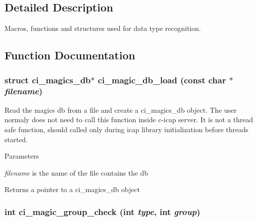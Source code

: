 \subsection{Detailed Description}
Macros, functions and structures used for data type recognition. 

\subsection{Function Documentation}
\hypertarget{group__DATATYPE_ga61edd8dcf006a279f7f310b5304c9127}{
\subsubsection[{ci\_\-magic\_\-db\_\-load}]{\setlength{\rightskip}{0pt plus 5cm}struct ci\_\-magics\_\-db$\ast$ ci\_\-magic\_\-db\_\-load (const char $\ast$ {\em filename})}}
\label{group__DATATYPE_ga61edd8dcf006a279f7f310b5304c9127}


Read the magics db from a file and create a ci\_\-magics\_\-db object. The user normaly does not need to call this function inside c-\/icap server. It is not a thread safe function, should called only during icap library initialization before threads started. 
\begin{DoxyParams}{Parameters}
\item[{\em filename}]is the name of the file contains the db \end{DoxyParams}
\begin{DoxyReturn}{Returns}
a pointer to a ci\_\-magics\_\-db object 
\end{DoxyReturn}
\hypertarget{group__DATATYPE_ga7982eeaaf7bec51490a0409382db447a}{
\subsubsection[{ci\_\-magic\_\-group\_\-check}]{\setlength{\rightskip}{0pt plus 5cm}int ci\_\-magic\_\-group\_\-check (int {\em type}, \/  int {\em group})}}
\label{group__DATATYPE_ga7982eeaaf7bec51490a0409382db447a}


